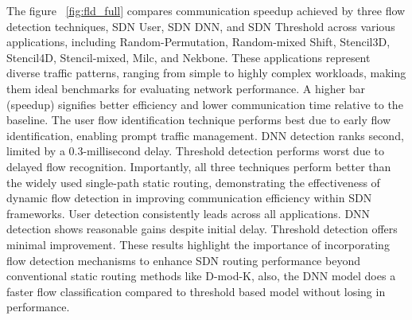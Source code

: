 The figure ~\ref{fig:fld_full} compares communication speedup achieved by three flow detection techniques, SDN User, SDN DNN, and SDN Threshold across various applications, including Random-Permutation, Random-mixed Shift, Stencil3D, Stencil4D, Stencil-mixed, Milc, and Nekbone. These applications represent diverse traffic patterns, ranging from simple to highly complex workloads, making them ideal benchmarks for evaluating network performance.  A higher bar (speedup) signifies better efficiency and lower communication time relative to the baseline. The user flow identification technique performs best due to early flow identification, enabling prompt traffic management. DNN detection ranks second, limited by a 0.3-millisecond delay. Threshold detection performs worst due to delayed flow recognition. Importantly, all three techniques perform better than the widely used single-path static routing, demonstrating the effectiveness of dynamic flow detection in improving communication efficiency within SDN frameworks. User detection consistently leads across all applications. DNN detection shows reasonable gains despite initial delay. Threshold detection offers minimal improvement. These results highlight the importance of incorporating flow detection mechanisms to enhance SDN routing performance beyond conventional static routing methods like D-mod-K, also, the DNN model does a faster flow classification compared to threshold based model without losing in performance.



